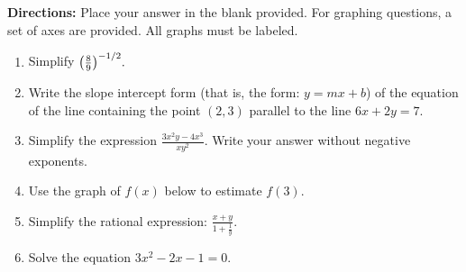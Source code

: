 \documentclass[12pt]{article}
\begin{document}
\textbf{Directions:}  Place your answer in the blank provided. For graphing questions, a set of axes are provided. All graphs must be labeled.
\begin{enumerate}
\item Simplify ${\large{\left(\frac{8}{9}\right)^{-1/2}}}.$


\quad \hfill \underline{\hspace{2in}}
\vfill

\item Write the slope intercept form (that is, the form: $y=mx+b$) of the equation of the line containing the point $(2,3)$ parallel to the line $6x+2y=7.$


\quad \hfill \underline{\hspace{2in}}
\vfill

\item  Simplify the expression $\displaystyle{\frac{3x^2y-4x^3}{xy^2}}$. Write your answer without negative exponents.
%

\quad \hfill \underline{\hspace{2in}}
\vfill

\item Use the graph of $f(x)$ below to estimate $f(3).$
% 

\quad \hfill \underline{\hspace{2in}}
\vfill

\item Simplify the rational expression: $\displaystyle{\frac{x+y}{1+\frac{1}{y}}}.$
%

\quad \hfill \underline{\hspace{2in}}
\vfill
\newpage

\item Solve the equation $3x^2-2x-1=0.$
%

\quad \hfill \underline{\hspace{2in}}
\vfill


\end{enumerate}
\end{document}

